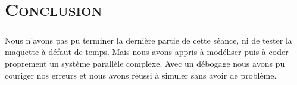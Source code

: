 
\chapter*{\textsc{Conclusion}}

	\paragraph{} Nous n'avons pas pu terminer la dernière partie de cette séance, ni de tester la maquette à défaut de temps. Mais nous avons appris à modéliser puis à coder proprement un système parallèle complexe. Avec un débogage nous avons pu couriger nos erreurs et nous avons réussi à simuler sans avoir de problème.\\
